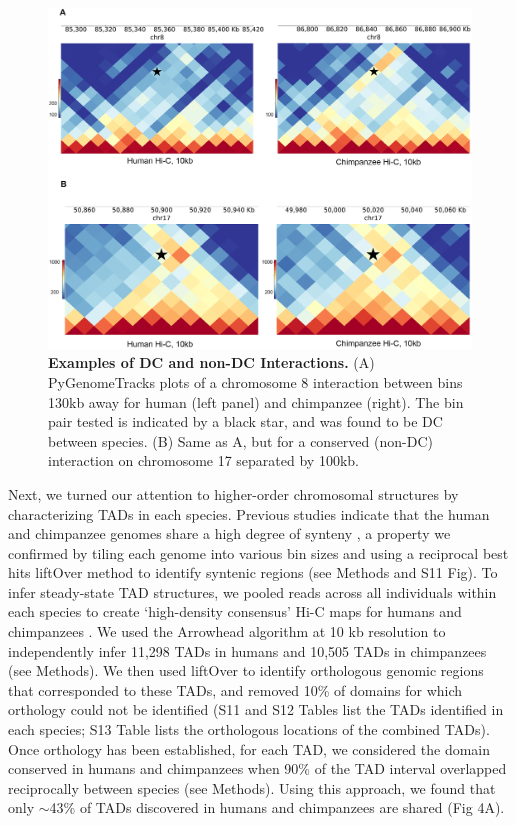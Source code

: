 \begin{figure}
\centering
\includegraphics[width=6in]{img/fig3.PNG}
\caption[Examples of DC and non-DC Interactions.]{\textbf{Examples of DC and non-DC Interactions.} (A) PyGenomeTracks plots \cite{Ramirez.2018} of a chromosome 8 interaction between bins 130kb away for human (left panel) and chimpanzee (right). The bin pair tested is indicated by a black star, and was found to be DC between species. (B) Same as A, but for a conserved (non-DC) interaction on chromosome 17 separated by 100kb.}
\label{fig:ch02-fig3}
\end{figure}

Next, we turned our attention to higher-order chromosomal structures by characterizing TADs in each species. Previous studies indicate that the human and chimpanzee genomes share a high degree of synteny \cite{Yunis.1982, Yunis.1980, Scally.2012, Kehrer-sawatzki.2007, Catacchio.2018, Lee.2016}, a property we confirmed by tiling each genome into various bin sizes and using a reciprocal best hits liftOver method to identify syntenic regions (see Methods and S11 Fig). To infer steady-state TAD structures, we pooled reads across all individuals within each species to create `high-density consensus' Hi-C maps for humans and chimpanzees \cite{Durand.2016}. We used the Arrowhead algorithm at 10 kb resolution \cite{Durand.2016} to independently infer 11,298 TADs in humans and 10,505 TADs in chimpanzees (see Methods). We then used liftOver to identify orthologous genomic regions that corresponded to these TADs, and removed 10\% of domains for which orthology could not be identified (S11 and S12 Tables list the TADs identified in each species; S13 Table lists the orthologous locations of the combined TADs). Once orthology has been established, for each TAD, we considered the domain conserved in humans and chimpanzees when 90\% of the TAD interval overlapped reciprocally between species (see Methods). Using this approach, we found that only $\sim$43\% of TADs discovered in humans and chimpanzees are shared (Fig 4A).

